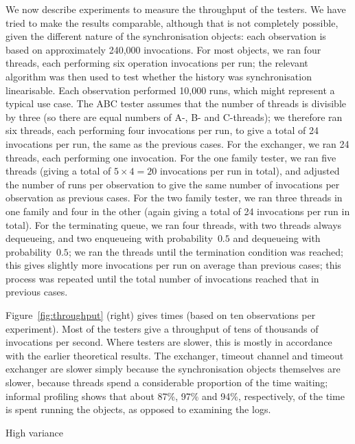 We now describe experiments to measure the throughput of the testers.  We have
tried to make the results comparable, although that is not completely
possible, given the different nature of the synchronisation objects: each
observation is based on approximately 240,000 invocations.  For most objects,
we ran four threads, each performing six operation invocations per run; the
relevant algorithm was then used to test whether the history was
synchronisation linearisable.  Each observation performed 10,000 runs, which
might represent a typical use case.  The ABC tester assumes that the number of
threads is divisible by three (so there are equal numbers of A-, B- and
C-threads); we therefore ran six threads, each performing four invocations per
run, to give a total of 24 invocations per run, the same as the previous
cases.  For the exchanger, we ran 24 threads, each performing one invocation.
For the one family tester, we ran five threads (giving a total of $5 \times 4
= 20$ invocations per run in total), and adjusted the number of runs per
observation to give the same number of invocations per observation as previous
cases.
%
For the two family tester, we ran three threads in one family and four in the
other (again giving a total of 24 invocations per run in total).
%
For the terminating queue, we ran four threads, with two threads always
dequeueing, and two enqueueing with probability~$0.5$ and dequeueing with
probability~$0.5$; we ran the threads until the termination condition was
reached; this gives slightly more invocations per run on average than previous
cases; this process was repeated until the total number of invocations reached
that in previous cases.

Figure~\ref{fig:throughput} (right) gives times (based on ten observations per
experiment).  Most of the testers give a throughput of tens of thousands of
invocations per second.  Where testers are slower, this is mostly in
accordance with the earlier theoretical results.  The exchanger, timeout
channel and timeout exchanger are slower simply because the synchronisation
objects themselves are slower, because threads spend a considerable proportion
of the time waiting; informal profiling shows that about 87\%, 97\% and 94\%,
respectively, of the time is spent running the objects, as opposed to
examining the logs.


 High variance


